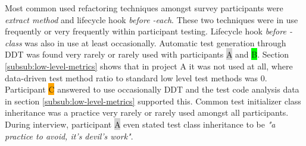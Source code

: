 Most common used refactoring techniques amongst survey participants were \textit{extract method} and lifecycle hook \textit{before -each}.
These two techniques were in use frequently or very frequently within participant testing. Lifecycle hook \textit{before -class} was also
in use at least occasionally. Automatic test generation through DDT was found very rarely or rarely used with participants {\colorbox{lightgray}A}
and {\colorbox{lime}B}. Section \ref{subsub:low-level-metrics} shows that in project A it was not used at all, where data-driven test method ratio to standard
low level test methods was 0. Participant {\colorbox{orange}C} answered to use occasionally DDT and the test code analysis
data in section \ref{subsub:low-level-metrics} supported this. Common test initializer class inheritance was a practice
very rarely or rarely used amongst all participants. During interview, participant {\colorbox{lightgray}A} even stated test class inheritance
to be \textit{"a practice to avoid, it's devil's work"}.

